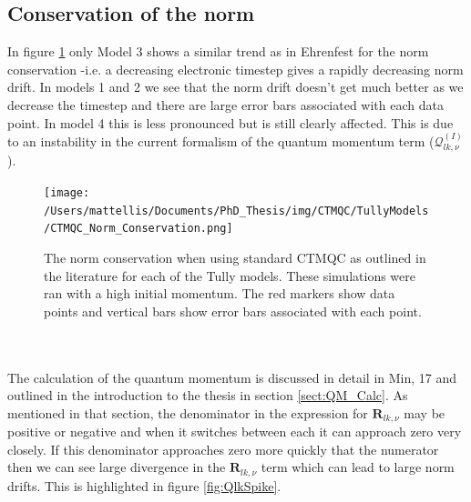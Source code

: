 \subsection{Conservation of the norm}
In figure \ref{fig:CTMQCNormCons} only Model 3 shows a similar trend as in Ehrenfest for the norm conservation -i.e. a decreasing electronic timestep gives a rapidly decreasing norm drift. In models 1 and 2 we see that the norm drift doesn't get much better as we decrease the timestep and there are large error bars associated with each data point. In model 4 this is less pronounced but is still clearly affected. This is due to an instability in the current formalism of the quantum momentum term ($\mathcal{Q}_{lk, \nu}^{(I)}$).
\begin{figure}[ht]
	\texttt{[image: /Users/mattellis/Documents/PhD\_Thesis/img/CTMQC/TullyModels/CTMQC\_Norm\_Conservation.png]}
	\caption{\label{fig:CTMQCNormCons}The norm conservation when using standard CTMQC as outlined in the literature for each of the Tully models. These simulations were ran with a high initial momentum. The red markers show data points and vertical bars show error bars associated with each point.}
\end{figure}
\\\\
The calculation of the quantum momentum is discussed in detail in Min, 17 \cite{min_ab_2017} and outlined in the introduction to the thesis in section \ref{sect:QM_Calc}. As mentioned in that section, the denominator in the expression for $\mathbf{R}_{lk, \nu}$ may be positive or negative and when it switches between each it can approach zero very closely. If this denominator approaches zero more quickly that the numerator then we can see large divergence in the $\mathbf{R}_{lk, \nu}$ term which can lead to large norm drifts. This is highlighted in figure \ref{fig:QlkSpike}.

